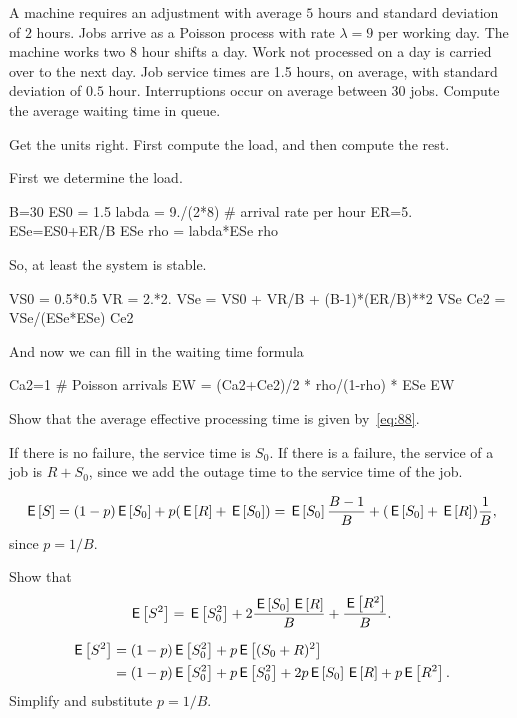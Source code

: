 \begin{exercise}
  A machine requires an adjustment with average $5$ hours and standard deviation of $2$ hours.
  Jobs arrive as a Poisson process with rate $\lambda=9$ per working day.
  The machine works two $8$ hour shifts a day.
  Work not processed on a day is carried over to the next day.
  Job service times are 1.5 hours, on average, with standard deviation of $0.5$ hour.
  Interruptions occur on average between $30$ jobs.
  Compute the average waiting time in queue.
\begin{hint}
  Get the units right. First compute the load, and then compute the rest.
\end{hint}
\begin{solution}
  First we determine the load. 
  \begin{pyconsole}
B=30
ES0 = 1.5
labda = 9./(2*8) # arrival rate per hour
ER=5.
ESe=ES0+ER/B
ESe
rho = labda*ESe
rho
  \end{pyconsole}
So, at least the system is stable.

\begin{pyconsole}
VS0 = 0.5*0.5
VR = 2.*2.
VSe = VS0 + VR/B + (B-1)*(ER/B)**2
VSe
Ce2 = VSe/(ESe*ESe)
Ce2
\end{pyconsole}

And now we can fill in the waiting time formula
\begin{pyconsole}
Ca2=1 # Poisson arrivals
EW = (Ca2+Ce2)/2 * rho/(1-rho) * ESe
EW  
\end{pyconsole}
\end{solution}
\end{exercise}

\begin{exercise}
Show that the average effective processing time is given by~\cref{eq:88}. 
\begin{hint}
If there is no failure, the service time is $S_0$. If there is a failure, the service of a job is $R + S_0$, since we add the outage time to the service time of the job. 
\end{hint}
  \begin{solution}
    \begin{equation*}
      \,\mathsf{E}\left[S\right] = (1-p)\,\mathsf{E}\left[S_0\right] + p (\,\mathsf{E}\left[R\right] + \,\mathsf{E}\left[S_0\right]) = \,\mathsf{E}\left[S_0\right] \frac{B-1}B + (\,\mathsf{E}\left[S_0\right] + \,\mathsf{E}\left[R\right]) \frac 1B,
    \end{equation*}
since $p=1/B$. 
  \end{solution}
\end{exercise}


\begin{extra}\label{ex:78}
  Show that
  \begin{equation*}
    \,\mathsf{E}\left[S^2\right] = \,\mathsf{E}\left[S_0^2\right] + 2\frac{\,\mathsf{E}\left[S_0\right]\,\mathsf{E}\left[R\right]} B + \frac{\,\mathsf{E}\left[R^2\right]}B.
  \end{equation*}
  \begin{solution}
  \begin{align*}
    \,\mathsf{E}\left[S^2\right] 
&= (1-p) \,\mathsf{E}\left[S_0^2\right] + p \,\mathsf{E}\left[(S_0+R)^2\right]\\
&= (1-p) \,\mathsf{E}\left[S_0^2\right] + p \,\mathsf{E}\left[S_0^2\right]  + 2 p \,\mathsf{E}\left[S_0\right] \,\mathsf{E}\left[R\right] + p \,\mathsf{E}\left[R^2\right]. 
  \end{align*}
  Simplify and substitute $p=1/B$. 
  \end{solution}
\end{extra}

